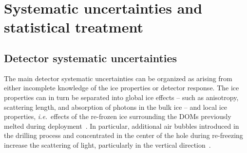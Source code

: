 \section{Systematic uncertainties and statistical treatment\label{sec:systematics}}

\subsection{Detector systematic uncertainties\label{sec:detector_systematics}}

The main detector systematic uncertainties can be organized as arising from either incomplete knowledge of the ice properties or detector response.
The ice properties can in turn be separated into global ice effects -- such as anisotropy, scattering length, and absorption of photons in the bulk ice -- and local ice properties, \textit{i.e.}\ effects of the re-frozen ice surrounding the DOMs previously melted during deployment~\cite{Karle:1994eua}.
In particular, additional air bubbles introduced in the drilling process and concentrated in the center of the hole during re-freezing increase the scattering of light, particularly in the vertical direction~\cite{Aartsen:2016nxy}.

